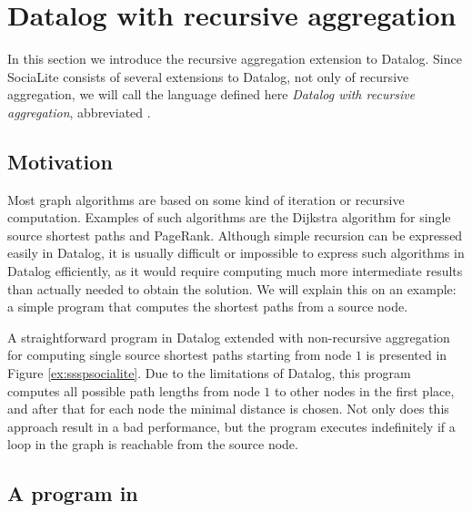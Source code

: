\section{Datalog with recursive aggregation}\label{s:recaggr}

In this section we introduce the recursive aggregation extension to Datalog. Since SociaLite consists of several extensions to Datalog, not only of recursive aggregation, we will call the language defined here \emph{Datalog with recursive aggregation}, abbreviated \datalogra.

\subsection{Motivation}
Most graph algorithms are based on some kind of iteration or recursive computation. Examples of such algorithms are the Dijkstra algorithm for single source shortest paths and PageRank. Although simple recursion can be expressed easily in Datalog, it is usually difficult or impossible to express such algorithms in Datalog efficiently, as it would require computing much more intermediate results than actually needed to obtain the solution. We will explain this on an example: a simple program that computes the shortest paths from a source node.

A straightforward program in Datalog extended with non-recursive aggregation for computing single source shortest paths starting from node $1$ is presented in Figure \ref{ex:ssspsocialite}. Due to the limitations of Datalog, this program computes all possible path lengths from node $1$ to other nodes in the first place, and after that for each node the minimal distance is chosen. Not only does this approach result in a bad performance, but the program executes indefinitely if a loop in the graph is reachable from the source node.


\subsection{A program in \datalogra}

